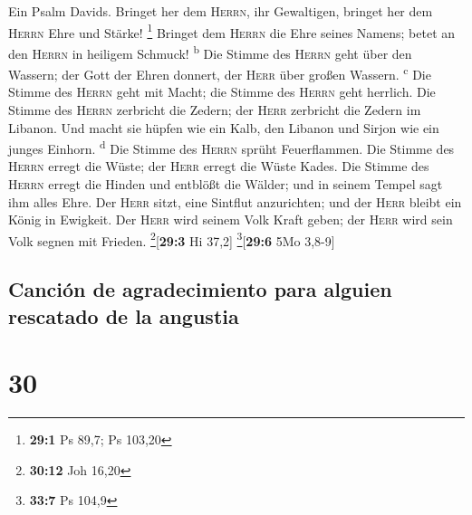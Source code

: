  Ein Psalm Davids. Bringet her dem \textsc{Herrn}, ihr
Gewaltigen, bringet her dem \textsc{Herrn} Ehre und Stärke! \footnote{\textbf{29:1}
  Ps 89,7; Ps 103,20}  Bringet dem \textsc{Herrn} die Ehre
seines Namens; betet an den \textsc{Herrn} in heiligem Schmuck!
\textsuperscript{b}  Die Stimme des \textsc{Herrn} geht
über den Wassern; der Gott der Ehren donnert, der \textsc{Herr} über
großen Wassern. \textsuperscript{c}  Die Stimme des
\textsc{Herrn} geht mit Macht; die Stimme des \textsc{Herrn} geht
herrlich.  Die Stimme des \textsc{Herrn} zerbricht die
Zedern; der \textsc{Herr} zerbricht die Zedern im Libanon.
 Und macht sie hüpfen wie ein Kalb, den Libanon und Sirjon
wie ein junges Einhorn. \textsuperscript{d}  Die Stimme
des \textsc{Herrn} sprüht Feuerflammen.  Die Stimme des
\textsc{Herrn} erregt die Wüste; der \textsc{Herr} erregt die Wüste
Kades.  Die Stimme des \textsc{Herrn} erregt die Hinden
und entblößt die Wälder; und in seinem Tempel sagt ihm alles Ehre.
 Der \textsc{Herr} sitzt, eine Sintflut anzurichten; und
der \textsc{Herr} bleibt ein König in Ewigkeit.  Der
\textsc{Herr} wird seinem Volk Kraft geben; der \textsc{Herr} wird sein
Volk segnen mit Frieden. \footnote{\textbf{30:12} Joh 16,20}{[}\textbf{29:3}
Hi 37,2{]} \footnote{\textbf{33:7} Ps 104,9}{[}\textbf{29:6} 5Mo
3,8-9{]}

\hypertarget{canciuxf3n-de-agradecimiento-para-alguien-rescatado-de-la-angustia}{%
\subsection{Canción de agradecimiento para alguien rescatado de la
angustia}\label{canciuxf3n-de-agradecimiento-para-alguien-rescatado-de-la-angustia}}

\hypertarget{section-29}{%
\section{30}\label{section-29}}


